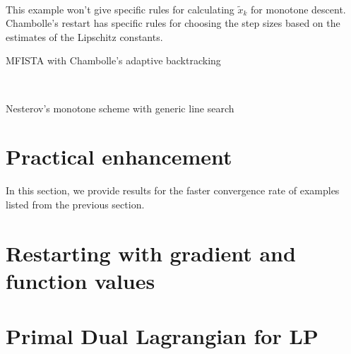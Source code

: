 \documentclass[12pt]{report}
\begin{document}
        \begin{example}\;\\\vspace{-1em}
            This example won't give specific rules for calculating $\tilde x_k$ for monotone descent. 
            Chambolle's restart has specific rules for choosing the step sizes based on the estimates of the Lipschitz constants. 
            \begin{algorithm}[H]\label{alg:mfista-chambolle-ada}
                \begin{algorithmic}[1]
                \end{algorithmic}
                \caption{MFISTA with Chambolle's adaptive backtracking}
            \end{algorithm}
        \end{example}

        \begin{example}\;\\\vspace{-1em}
            \begin{algorithm}\label{alg:nesterov-mono-generic-ls}
            \begin{algorithmic}[1]
            \end{algorithmic}\caption{Nesterov's monotone scheme with generic line search}
            \end{algorithm}
        \end{example}

    \section{Practical enhancement}
        In this section, we provide results for the faster convergence rate of examples listed from the previous section. 
    \section{Restarting with gradient and function values}
        


\section{Primal Dual Lagrangian for LP}
    






\end{document}
